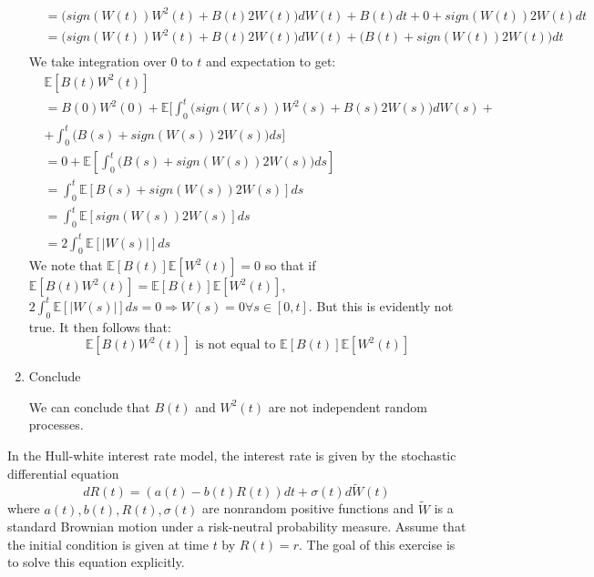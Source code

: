 \documentclass[12pt,twoside, letter]{exam}
\theoremstyle{definition}
\newcommand{\ee}{\mathbb{E}}
\begin{document}
\begin{enumerate}
\begin{solution}
\begin{align*}
          &=  \bigg(sign(W(t))W^2(t) + B(t)2W(t)\bigg) dW(t) + B(t)dt + 0 + sign(W(t))2W(t)dt \\
          &= \bigg(sign(W(t))W^2(t) + B(t)2W(t)\bigg) dW(t) + \bigg(B(t) + sign(W(t))2W(t)\bigg) dt \\
        \end{align*}
        We take integration over 0 to $t$ and expectation to get:
        \begin{align*}
          &\ee[B(t)W^2(t)] \\
          &= B(0)W^2(0) + \ee[\int^t_0 \bigg(sign(W(s))W^2(s) +B(s)2W(s)\bigg) dW(s) + \\
          &+ \int^t_0 \bigg(B(s) + sign(W(s))2W(s)\bigg) ds] \\
          &= 0 + \ee[\int^t_0 \bigg(B(s) + sign(W(s))2W(s)\bigg) ds] \\
          &= \int^t_0 \ee[B(s) + sign(W(s))2W(s)] ds \\
          &= \int^t_0 \ee[sign(W(s))2W(s)] ds \\
          &= 2\int^t_0 \ee[|W(s)|] ds
        \end{align*}
        We note that $\ee[B(t)]\ee[W^2(t)] = 0$ so that if $\ee[B(t)W^2(t)] = \ee[B(t)]\ee[W^2(t)]$,
        $2 \int^t_0 \ee[|W(s)|] ds = 0 \Rightarrow W(s) = 0 \forall s \in [0,t]$. But this is evidently not true.
        It then follows that:
        \begin{equation*}
          \ee[B(t)W^2(t)] \text{ is not equal to } \ee[B(t)]\ee[W^2(t)]
        \end{equation*}
      \end{solution}
    \item Conclude
      \begin{solution}
        We can conclude that $B(t)$ and $W^2(t)$ are not independent random processes.
      \end{solution}
  \end{enumerate}

  \par{In the Hull-white interest rate model, the interest rate is given by the stochastic
  differential equation}
  \begin{equation*}
    dR(t) = (a(t) - b(t)R(t))dt + \sigma(t) d\tilde{W}(t)
  \end{equation*}
  where $a(t), b(t), R(t), \sigma(t)$ are nonrandom positive functions and $\tilde{W}$ is a
  standard Brownian motion under a risk-neutral probability measure. Assume that the initial
  condition is given at time $t$ by $R(t) = r$. The goal of this exercise is to solve this
  equation explicitly.
\end{document}
